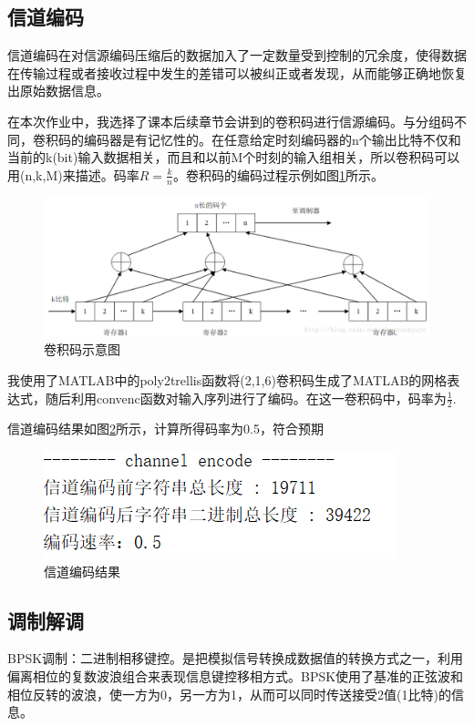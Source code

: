 \documentclass{../source/zju}
\begin{document}
        \subsection{信道编码}
        信道编码在对信源编码压缩后的数据加入了一定数量受到控制的冗余度，使得数据在传输过程或者接收过程中发生的差错可以被纠正或者发现，从而能够正确地恢复出原始数据信息。

        在本次作业中，我选择了课本后续章节会讲到的卷积码进行信源编码。与分组码不同，卷积码的编码器是有记忆性的。在任意给定时刻编码器的n个输出比特不仅和当前的k(bit)输入数据相关，而且和以前M个时刻的输入组相关，所以卷积码可以用(n,k,M)来描述。码率$R= \frac{k}{n}$。卷积码的编码过程示例如图\ref{卷积码示例}所示。
        \begin{figure}[H]
            \centering
            \includegraphics[width = \textwidth]{figure/卷积码示意图.png}
            \caption{卷积码示意图}
            \label{卷积码示例}
        \end{figure}
        我使用了MATLAB中的poly2trellis函数将(2,1,6)卷积码生成了MATLAB的网格表达式，随后利用convenc函数对输入序列进行了编码。在这一卷积码中，码率为$\frac{1}{2}$.

        信道编码结果如图\ref{信道编码结果}所示，计算所得码率为0.5，符合预期
        \begin{figure}[H]
            \centering
            \includegraphics[]{figure/信道编码结果.png}
            \caption{信道编码结果}
            \label{信道编码结果}
        \end{figure}

        \subsection{调制解调}
        BPSK调制：二进制相移键控。是把模拟信号转换成数据值的转换方式之一，利用偏离相位的复数波浪组合来表现信息键控移相方式。BPSK使用了基准的正弦波和相位反转的波浪，使一方为0，另一方为1，从而可以同时传送接受2值(1比特)的信息。
\end{document}
